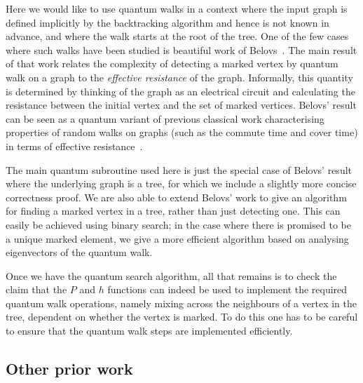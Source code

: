 \documentclass[11pt]{article}
\begin{document}
Here we would like to use quantum walks in a context where the input graph is defined implicitly by the backtracking algorithm and hence is not known in advance, and where the walk starts at the root of the tree. One of the few cases where such walks have been studied is beautiful work of Belovs~\cite{belovs13,belovs13a}. The main result of that work relates the complexity of detecting a marked vertex by quantum walk on a graph to the {\em effective resistance} of the graph. Informally, this quantity is determined by thinking of the graph as an electrical circuit and calculating the resistance between the initial vertex and the set of marked vertices. Belovs' result can be seen as a quantum variant of previous classical work characterising properties of random walks on graphs (such as the commute time and cover time) in terms of effective resistance~\cite{chandra97}.

The main quantum subroutine used here is just the special case of Belovs' result where the underlying graph is a tree, for which we include a slightly more concise correctness proof. We are also able to extend Belovs' work to give an algorithm for finding a marked vertex in a tree, rather than just detecting one. This can easily be achieved using binary search; in the case where there is promised to be a unique marked element, we give a more efficient algorithm based on analysing eigenvectors of the quantum walk.

Once we have the quantum search algorithm, all that remains is to check the claim that the $P$ and $h$ functions can indeed be used to implement the required quantum walk operations, namely mixing across the neighbours of a vertex in the tree, dependent on whether the vertex is marked. To do this one has to be careful to ensure that the quantum walk steps are implemented efficiently.


\subsection{Other prior work}
\end{document}
